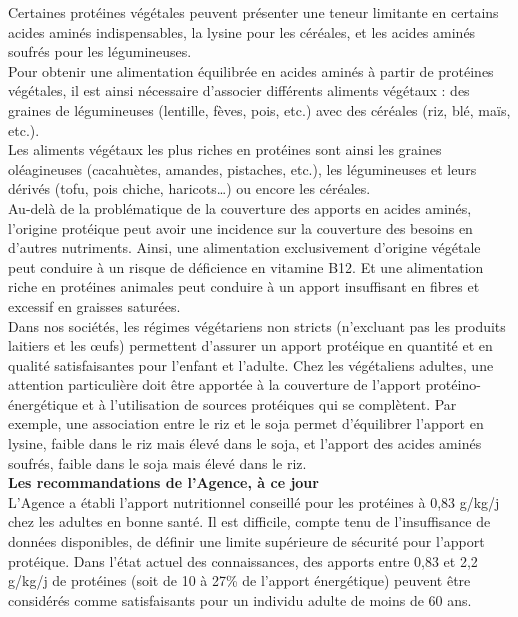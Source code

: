 \documentclass[8pt]{article}
\begin{document}
Certaines protéines végétales peuvent présenter une teneur limitante en certains acides aminés indispensables, la lysine pour les céréales, et les acides aminés soufrés pour les légumineuses.\\

Pour obtenir une alimentation équilibrée en acides aminés à partir de protéines végétales, il est ainsi nécessaire d'associer différents aliments végétaux : des graines de légumineuses (lentille, fèves, pois, etc.) avec des céréales (riz, blé, maïs, etc.). \\

Les aliments végétaux les plus riches en protéines sont ainsi les graines oléagineuses (cacahuètes, amandes, pistaches, etc.), les légumineuses et leurs dérivés (tofu, pois chiche, haricots…) ou encore les céréales.\\

Au-delà de la problématique de la couverture des apports en acides aminés, l’origine protéique peut avoir une incidence sur la couverture des besoins en d’autres nutriments. Ainsi, une alimentation exclusivement d’origine végétale peut conduire à un risque de déficience en vitamine B12. Et une alimentation riche en protéines animales peut conduire à un apport insuffisant en fibres et excessif en graisses saturées.\\

Dans nos sociétés, les régimes végétariens non stricts (n’excluant pas les produits laitiers et les œufs) permettent d’assurer un apport protéique en quantité et en qualité satisfaisantes pour l’enfant et l’adulte. Chez les végétaliens adultes, une attention particulière doit être apportée à la couverture de l’apport protéino-énergétique et à l’utilisation de sources protéiques qui se complètent. Par exemple, une association entre le riz et le soja permet d’équilibrer l’apport en lysine, faible dans le riz mais élevé dans le soja, et l’apport des acides aminés soufrés, faible dans le soja mais élevé dans le riz.\\

\textbf{Les recommandations de l’Agence, à ce jour}\\

L’Agence a établi l’apport nutritionnel conseillé pour les protéines à 0,83 g/kg/j chez les adultes en bonne santé. 
Il est difficile, compte tenu de l’insuffisance de données disponibles, de définir une limite supérieure de sécurité pour l’apport protéique. Dans l’état actuel des connaissances, des apports entre 0,83 et 2,2 g/kg/j de protéines (soit de 10 à 27\% de l’apport énergétique) peuvent être considérés comme satisfaisants pour un individu adulte de moins de 60 ans.\\
\end{document}
